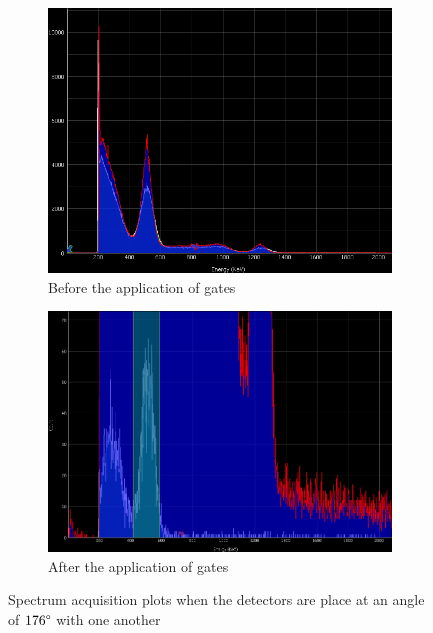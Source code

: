 \documentclass[%
 reprint,
nofootinbib,
 amsmath,amssymb,
 aps,
floatfix,
]{revtex4-2}
\begin{document}
    \begin{figure}
        \centering
        \begin{subfigure}[b]{0.5\textwidth}
            \centering
            \includegraphics[scale = 0.55]{Figures/spectrum_acquisition_176.png}
            \caption{Before the application of gates}
            \label{fig:176spec}
        \end{subfigure}
        \hfill
        \begin{subfigure}[b]{0.5\textwidth}
            \centering
            \includegraphics[scale = 0.45]{Figures/after_gate_176.png}
            \caption{After the application of gates}
            \label{fig:176gate}
        \end{subfigure}
            \caption{Spectrum acquisition plots when the detectors are place at an angle of $176 \degree$ with one another}
            \label{fig:176}
    \end{figure}
\end{document}
